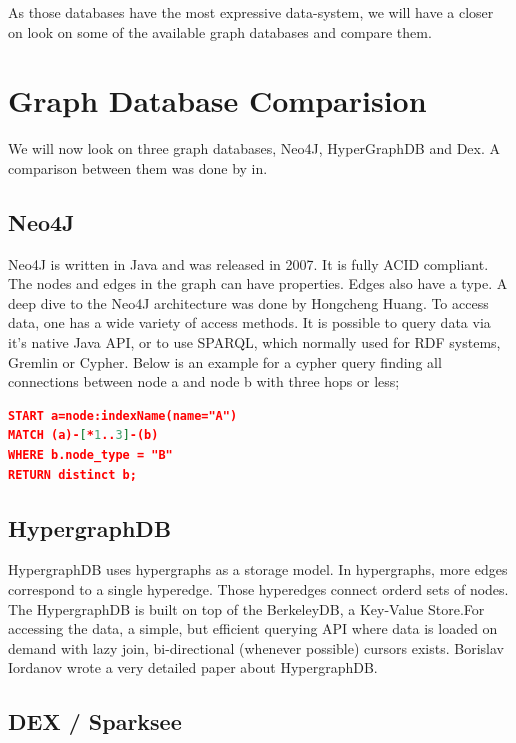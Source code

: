\documentclass{acm_proc_article-sp}
\begin{document}
As those databases have the most expressive data-system, we will have a closer on look on some of the available graph databases and compare them.

\section{Graph Database Comparision}

We will now look on three graph databases, Neo4J, HyperGraphDB and Dex. A comparison between them was done by in\cite{comparision}.

\subsection{Neo4J}

Neo4J is written in Java and was released in 2007. It is fully ACID compliant. The nodes and edges in the graph can have properties. Edges also have a type. A deep dive to the Neo4J architecture was done by Hongcheng Huang\cite{n4j}. To access data, one has a wide variety of access methods. It is possible to query data via it's native Java API, or to use SPARQL, which normally used for RDF systems, Gremlin or Cypher. Below is an example for a cypher query finding all connections between node a and node b with three hops or less;

\begin{lstlisting}[language=json,firstnumber=1]
START a=node:indexName(name="A")
MATCH (a)-[*1..3]-(b)
WHERE b.node_type = "B"
RETURN distinct b;
\end{lstlisting}

\subsection{HypergraphDB}

HypergraphDB uses hypergraphs as a storage model. In hypergraphs, more edges correspond to a single hyperedge. Those hyperedges connect orderd sets of nodes. The HypergraphDB is built on top of the BerkeleyDB, a Key-Value Store.For accessing the data, a simple, but efficient querying API where data is loaded on demand with lazy join, bi-directional (whenever possible) cursors exists. Borislav Iordanov wrote a very detailed paper about HypergraphDB\cite{hyper}.

\subsection{DEX / Sparksee}
\end{document}
